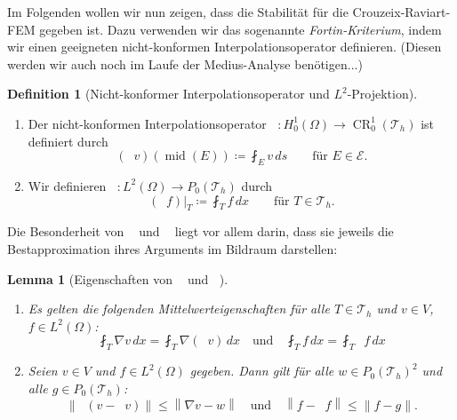 \documentclass[a4paper]{scrartcl}
\newcommand{\Hzero}{H_0^1}
\newcommand{\Ltwo}{L^2}
\newcommand{\crfem}{\operatorname{CR}_0^1}
\newcommand{\mesh}{\mathcal{T}_h}
\newcommand{\edges}{\mathcal{E}}
\newcommand{\dx}{\,dx}
\newcommand{\norm}[1]{\left\lVert#1\right\rVert}
\DeclareMathOperator{\nablah}{\nabla_{\textit{h}}}
\DeclareMathOperator{\midOp}{mid}
\DeclareMathOperator{\intOp}{I_{NC}}
\DeclareMathOperator{\LtwoOp}{\Pi_0}
\theoremstyle{plain}
\newtheorem{lemma}{Lemma}
\theoremstyle{definition}
\newtheorem{definition}{Definition}
\theoremstyle{remark}
\begin{document}
\noindent Im Folgenden wollen wir nun zeigen, dass die Stabilität für die
Crouzeix-Raviart-FEM gegeben ist. Dazu verwenden wir das sogenannte
\emph{Fortin-Kriterium}, indem wir einen geeigneten nicht-konformen
Interpolationsoperator definieren. {\color{red}(Diesen werden wir auch noch im
Laufe der Medius-Analyse benötigen...)}

\begin{definition}[Nicht-konformer Interpolationsoperator und
  \(\Ltwo\)-Projektion] \label{def:2}
  \begin{enumerate}[label=\emph{(\roman*)}]
  \item Der nicht-konformen Interpolationsoperator \(\intOp\colon
    \Hzero(\Omega) \rightarrow \crfem(\mesh)\) ist definiert durch
    \begin{equation}
      \label{eq:15}
      (\intOp v)(\midOp(E)) \coloneqq \fint_E v \,ds \qquad \text{für } E \in \edges. 
    \end{equation}
  \item Wir definieren \(\LtwoOp \colon \Ltwo(\Omega) \rightarrow
    P_0(\mesh)\) durch 
    \begin{equation}
      \label{eq:13}
      (\LtwoOp f)|_T \coloneqq \fint_T f \dx \qquad \text{für } T\in \mesh. 
    \end{equation}
  \end{enumerate}
\end{definition}

Die Besonderheit von \(\intOp\) und \(\LtwoOp\) liegt vor allem
darin, dass sie jeweils die Bestapproximation ihres Arguments im
Bildraum darstellen: 

\begin{lemma}[Eigenschaften von \(\intOp\) und \(\LtwoOp\)] \label{lem:1}
  \begin{enumerate}[label=(\roman*)]
  \item Es gelten die folgenden Mittelwerteigenschaften für alle 
    \(T\in\mesh\) und \(v\in V\), \(f\in\Ltwo(\Omega)\): 
    \begin{equation}
      \label{eq:16}
      \fint_T \nabla v \dx = \fint_T \nabla(\intOp v) \dx \quad \text{und} \quad
      \fint_T f \dx = \fint_T \LtwoOp f \dx 
    \end{equation}
  \item Seien \(v\in V\) und \(f\in \Ltwo(\Omega)\) gegeben. Dann gilt
    für alle \(w\in P_0(\mesh)^2\) und alle \(g\in P_0(\mesh)\): 
    \begin{equation}
      \label{eq:17}
      \norm{\nablah(v-\intOp v)} \leq \norm{\nabla v - w} \quad
      \text{und} \quad \norm{f-\LtwoOp f} \leq \norm{f-g}. 
    \end{equation}
  \end{enumerate}
\end{lemma}
\end{document}

